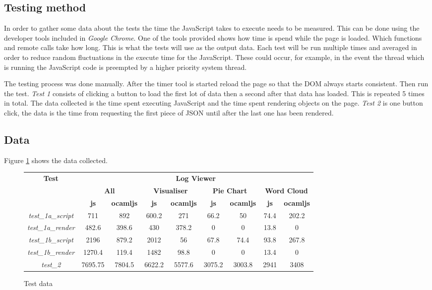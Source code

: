 \subsection{Testing method}
In order to gather some data about the tests the time the JavaScript takes to execute needs to be measured. This can be done using the developer tools included in \emph{Google Chrome}. One of the tools provided shows how time is spend while the page is loaded. Which functions and remote calls take how long. This is what the tests will use as the output data. Each test will be run multiple times and averaged in order to reduce random fluctuations in the execute time for the JavaScript. These could occur, for example, in the event the thread which is running the JavaScript code is preempted by a higher priority system thread.

The testing process was done manually. After the timer tool is started reload the page so that the DOM always starts consistent. Then run the test. \emph{Test 1} consists of clicking a button to load the first lot of data then a second after that data has loaded. This is repeated 5 times in total. The data collected is the time spent executing JavaScript and the time spent rendering objects on the page. \emph{Test 2} is one button click, the data is the time from requesting the first piece of JSON until after the last one has been rendered.

\subsection{Data}

Figure \ref{test_data} shows the data collected.

\begin{figure}
  \begin{tabular}{|c|c|c|c|c|c|c|c|c|}
    \hline
    \textbf{Test} & \multicolumn{8}{|c|}{\textbf{Log Viewer}} \\
    \cline{2-9}
    & \multicolumn{2}{|c|}{\textbf{All}} & \multicolumn{2}{|c|}{\textbf{Visualiser}} & \multicolumn{2}{|c|}{\textbf{Pie Chart}} & \multicolumn{2}{|c|}{\textbf{Word Cloud}} \\
    \cline{2-9}
    & \textbf{js} & \textbf{ocamljs} & \textbf{js} & \textbf{ocamljs} & \textbf{js} & \textbf{ocamljs} & \textbf{js} & \textbf{ocamljs}\\
    \hline
    \emph{test\_1a\_script} & 711 & 892 & 600.2 & 271 & 66.2 & 50 & 74.4 & 202.2 \\
    \hline
    \emph{test\_1a\_render} & 482.6 & 398.6 & 430 & 378.2 & 0 & 0 & 13.8 & 0 \\
    \hline
    \emph{test\_1b\_script} & 2196 & 879.2 & 2012 & 56 & 67.8 & 74.4 & 93.8 & 267.8 \\
    \hline
    \emph{test\_1b\_render} & 1270.4 & 119.4 & 1482 & 98.8 & 0 & 0 & 13.4 & 0 \\
    \hline
    \emph{test\_2} & 7695.75 & 7804.5 & 6622.2 & 5577.6 & 3075.2 & 3003.8 & 2941 & 3408 \\
    \hline
  \end{tabular}
  \caption{Test data}
  \label{test_data}
\end{figure}


